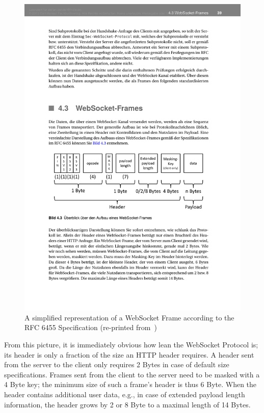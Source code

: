 \documentclass[a4paper, justified, notoc]{tufte-handout} %
\begin{document}
\begin{figure}%
	\centering
  \includegraphics[width=1\textwidth]{./src/figures/websocket_frame_simple.pdf}
  \caption{A simplified representation of a WebSocket Frame according to the RFC 6455 Specification (re-printed from~\citep{gorski:2015})}
  \label{fig:frame_simple}
\end{figure}
From this picture, it is immediately obvious how lean the WebSocket Protocol is; its header is only a fraction of the size an HTTP header requires. A header sent from the server to the client only requires 2 Bytes in case of default size specifications. Frames sent from the client to the server need to be masked with a 4 Byte key; the minimum size of such a frame's header is thus 6 Byte. When the header contains additional user data, e.g., in case of extended payload length information, the header grows by 2 or 8 Byte to a maximal length of 14 Bytes.
\end{document}
